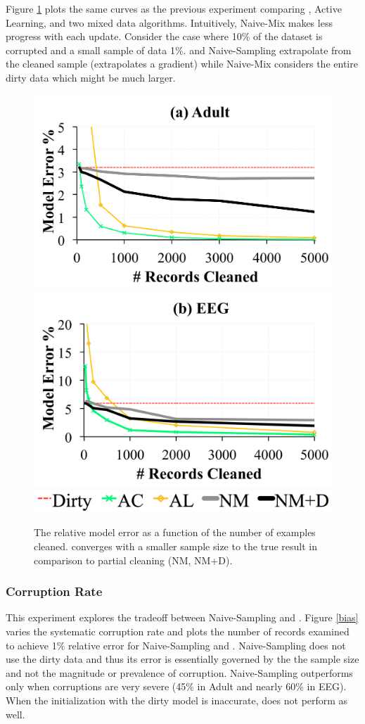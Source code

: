 Figure \ref{pc-perf} plots the same curves as the previous experiment comparing \sys, Active Learning, and two mixed data algorithms.
Intuitively, Naive-Mix makes less progress with each update.
Consider the case where 10\% of the dataset is corrupted and a small sample of data 1\%.
\sys and Naive-Sampling extrapolate from the cleaned sample (\sys extrapolates a gradient) while Naive-Mix considers the entire dirty data which might be much larger.


\begin{figure}[ht!]
\centering\vspace{-0.5em}
 \includegraphics[width=0.49\columnwidth]{exp/exp14a.pdf}
    \includegraphics[width=0.49\columnwidth]{exp/exp14b.pdf}
    \includegraphics[width=0.49\columnwidth]{exp/legend-14.png}\vspace{-0.5em}
 \caption{The relative model error as a function of the number of examples cleaned. \sys converges with a smaller sample size to the true result in comparison to partial cleaning (NM, NM+D).  \label{pc-perf}}
\end{figure}

\subsubsection{Corruption Rate}
This experiment explores the tradeoff between Naive-Sampling and \sys.
Figure \ref{bias} varies the systematic corruption rate and plots the number of records examined to achieve 1\% relative error for Naive-Sampling and \sys.
Naive-Sampling does not use the dirty data and thus its error is essentially governed by the the sample size and not the magnitude or prevalence of corruption.
Naive-Sampling outperforms \sys only when corruptions are very severe (45\% in Adult and nearly 60\% in EEG).
When the initialization with the dirty model is inaccurate, \sys does not perform as well. 

